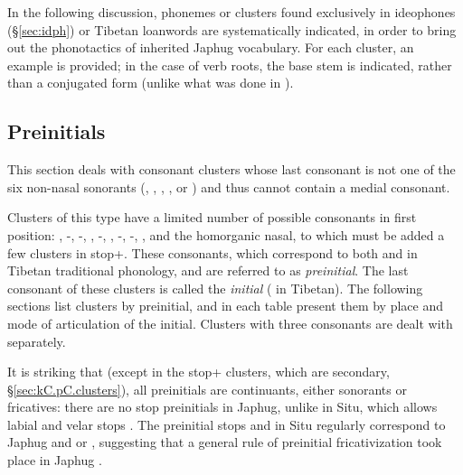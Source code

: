 In the following discussion, phonemes or clusters found exclusively in ideophones (§\ref{sec:idph}) or Tibetan loanwords are systematically indicated, in order to bring out the phonotactics of inherited Japhug vocabulary. For each cluster, an example is provided; in the case of verb roots, the base stem is indicated, rather than a conjugated form (unlike what was done in  \citealt{jacques19ipa}).



\subsection{Preinitials} \label{sec:preinitials}
This section deals with consonant clusters whose last consonant is not one of the six non-nasal sonorants (, , , ,  or ) and thus cannot contain a medial consonant. 

Clusters of this type have a limited number of possible consonants in first position: , -, -, , -, , -, -, ,  and the homorganic nasal, to which must be added a few clusters in stop+. These consonants, which correspond to both  and  in Tibetan traditional phonology, and are referred to as \textit{preinitial}. The last consonant of these clusters is called the \textit{initial} ( in Tibetan). The following sections list clusters by preinitial, and in each table present them by place and mode of articulation of the initial. Clusters with three consonants are dealt with separately.

It is striking that (except in the stop+ clusters, which are secondary, §\ref{sec:kC.pC.clusters}), all preinitials are continuants, either sonorants or fricatives: there are no stop preinitials in Japhug, unlike in Situ, which allows labial and velar stops \citep[44]{zhang16bragdbar}. The preinitial stops   and  in Situ regularly correspond to Japhug  and  or , suggesting that a general rule of preinitial fricativization took place in Japhug \citep[273]{jacques04these}.



